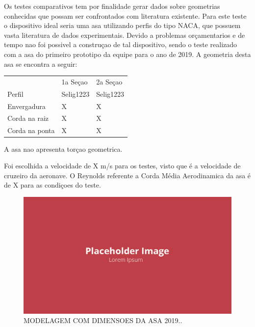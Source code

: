 Os testes comparativos tem por finalidade gerar dados sobre geometrias conhecidas que possam ser confrontados com literatura existente. Para este teste o dispositivo ideal seria uma asa utilizando perfis do tipo NACA, que possuem vasta literatura de dados experimentais. Devido a problemas orçamentarios e de tempo nao foi possivel a construçao de tal dispositivo, sendo o teste realizado com a asa do primeiro prototipo da equipe para o ano de 2019. A geometria desta asa se encontra a seguir:

\begin{table}[]
\centering
\begin{tabular}{lll}
 & 1a Seçao & 2a Seçao \\
Perfil & Selig1223 & Selig1223 \\
Envergadura & X & X \\
Corda na raiz & X & X \\
Corda na ponta & X & X
\end{tabular}
\end{table}

A asa nao apresenta torçao geometrica.

Foi escolhida a velocidade de X m/s para os testes, visto que é a velocidade de cruzeiro da aeronave. O Reynolds referente a Corda Média Aerodinamica da asa é de X para as condiçoes do teste.


\begin{figure}[!ht]
    \centering
    \includegraphics[width=.8\linewidth]{figuras/placeholder.png}
    \caption{MODELAGEM COM DIMENSOES DA ASA 2019.\cite{autor}.}
    \label{fig:placeholder}
\end{figure}

